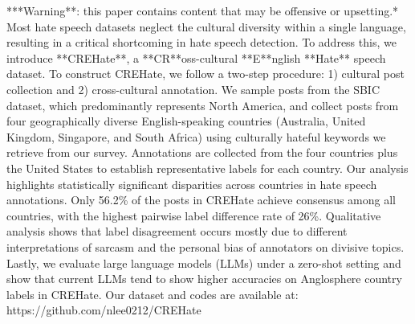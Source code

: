 ***Warning**: this paper contains content that may be offensive or upsetting.* Most hate speech datasets neglect the cultural diversity within a single language, resulting in a critical shortcoming in hate speech detection.  To address this, we introduce **CREHate**, a **CR**oss-cultural **E**nglish **Hate** speech dataset. To construct CREHate, we follow a two-step procedure: 1) cultural post collection and 2) cross-cultural annotation. We sample posts from the SBIC dataset, which predominantly represents North America, and collect posts from four geographically diverse English-speaking countries (Australia, United Kingdom, Singapore, and South Africa) using culturally hateful keywords we retrieve from our survey. Annotations are collected from the four countries plus the United States to establish representative labels for each country. Our analysis highlights statistically significant disparities across countries in hate speech annotations. Only 56.2\% of the posts in CREHate achieve consensus among all countries, with the highest pairwise label difference rate of 26\%. Qualitative analysis shows that label disagreement occurs mostly due to different interpretations of sarcasm and the personal bias of annotators on divisive topics. Lastly, we evaluate large language models (LLMs) under a zero-shot setting and show that current LLMs tend to show higher accuracies on Anglosphere country labels in CREHate. Our dataset and codes are available at: https://github.com/nlee0212/CREHate